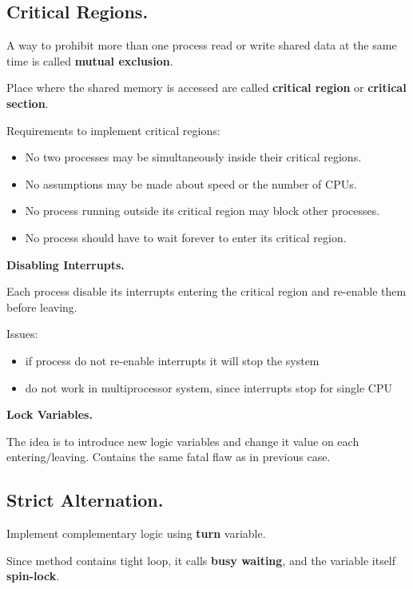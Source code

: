 \documentclass{article}
\begin{document}
\subsection*{Critical Regions.}
\noindent

A way to prohibit more than one process read or write shared data at the same time is called \textbf{mutual exclusion}.

Place where the shared memory is accessed are called \textbf{critical region} or \textbf{critical section}.

Requirements to implement critical regions:

\begin{itemize}
  \item No two processes may be simultaneously inside their critical regions.
  \item No assumptions may be made about speed or the number of CPUs.
  \item No process running outside its critical region may block other processes.
  \item No process should have to wait forever to enter its critical region.
\end{itemize}

\textbf{Disabling Interrupts.}

Each process disable its interrupts entering the critical region and re-enable them before leaving.

Issues:

\begin{itemize}
  \item if process do not re-enable interrupts it will stop the system
  \item do not work in multiprocessor system, since interrupts stop for single CPU
\end{itemize}

\textbf{Lock Variables.}

The idea is to introduce new logic variables and change it value on each entering/leaving. Contains the same fatal flaw
as in previous case.

\subsection*{Strict Alternation.}
\noindent

Implement complementary logic using \textbf{turn} variable.

Since method contains tight loop, it calls \textbf{busy waiting}, and the variable itself \textbf{spin-lock}.
\end{document}
